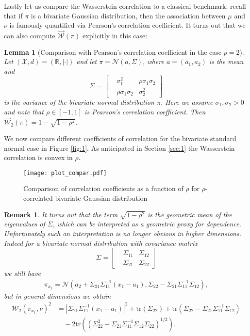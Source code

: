 \documentclass[10pt]{amsart}
\newtheorem{lemma}[theorem]{Lemma}
\newtheorem{remark}[theorem]{Remark}
\newcommand{\R}{\mathbb{R}}
\begin{document}
Lastly let us compare the Wasserstein correlation to a classical benchmark: recall that if $\pi$ is a bivariate Gaussian distribution, then the association between $\mu$ and $\nu$ is famously quantified via Pearson's correlation coefficient. It turns out that we can also compute $\overrightarrow{\mathcal{W}}(\pi)$ explicitly in this case: 


\begin{lemma}[Comparison with Pearson's correlation coefficient in the case $p=2$] \label{lem:pearson}
Let $(\mathcal{X},d)=(\R,|\cdot|)$ and let $\pi=\mathcal{N}(a, \Sigma)$, where
$a=(a_1, a_2)$ is the mean and $$\Sigma=\begin{bmatrix}
&\sigma_1^2& \rho \sigma_1\sigma_2\\
&\rho \sigma_1 \sigma_2 &\sigma_2^2
\end{bmatrix}$$
is the variance of the bivariate normal distribution $\pi$. Here we assume $\sigma_1, \sigma_2> 0$ and note that $\rho\in [-1,1]$ is Pearson's correlation coefficient. Then $\overrightarrow{\mathcal{W}}_2(\pi)=1-\sqrt{1-\rho^2}.$
\end{lemma}

We now compare different coefficients of correlation for the bivariate standard normal case in Figure \ref{fig:1}. As anticipated in Section \ref{sec:1} the Wasserstein correlation is convex in $\rho$.

\begin{center}
\begin{figure}[h!]
\texttt{[image: plot\_compar.pdf]}
\caption{Comparison of correlation coefficients as a function of $\rho$ for $\rho$-correlated bivariate Gaussian distribution}
\end{figure}\label{fig:1}
\end{center}

\begin{remark}
It turns out that the term $\sqrt{1-\rho^2}$ is the geometric mean of the eigenvalues of $\Sigma$, which can be interpreted as a geometric proxy for dependence. Unfortunately such an interpretation is no longer obvious in higher dimensions. Indeed for a bivariate normal distribution with covariance matrix
$$\Sigma=\begin{bmatrix}
&\Sigma_{11}& \Sigma_{12}\\
&\Sigma_{21} & \Sigma_{22}
\end{bmatrix}$$
we still have
\begin{align*}
\pi_{x_1}=\mathcal{N}\left( a_2+\Sigma_{21}\Sigma_{11}^{-1} (x_1-a_1), \Sigma_{22}-\Sigma_{21}\Sigma_{11}^{-1}\Sigma_{12} \right),
\end{align*}
but in general dimensions we obtain
\begin{align*}
\mathcal{W}_2(\pi_{x_1},\nu)^2 &= \left|\Sigma_{21} \Sigma_{11}^{-1} (x_1-a_1) \right|^2 +\mathrm{tr}\left(\Sigma_{22}\right)+\mathrm{tr}\left( \Sigma_{22}-\Sigma_{21}\Sigma_{11}^{-1}\Sigma_{12}\right)\\
&\quad -2 \mathrm{tr}\left(\left( \Sigma_{22}^2-\Sigma_{21}\Sigma_{11}^{-1}\Sigma_{12}\Sigma_{22} \right)^{1/2}\right).
\end{align*}
\end{remark}
\end{document}
